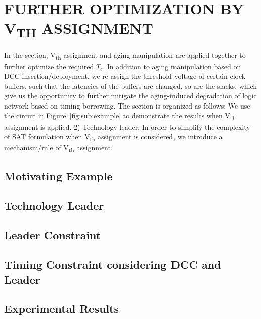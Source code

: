 \section{FURTHER OPTIMIZATION BY V\textsubscript{TH} ASSIGNMENT}
\label{sec:TVA}
In the section, V\textsubscript{th} assignment and aging manipulation are applied together to further optimize the required $T_c$. In addition to aging manipulation based on DCC insertion/deployment, we re-assign the threshold voltage of certain clock buffers, such that the latencies of the buffers are changed, so are the slacks, which give us the opportunity to further mitigate the aging-induced degradation of logic network based on timing borrowing. The section is organized as follows:  We use the circuit in Figure~\ref{fig:sub:example} to demonstrate the results when V\textsubscript{th} assignment is applied. 2) Technology leader: In order to simplify the complexity of SAT formulation when V\textsubscript{th} assignment is considered, we introduce a mechanism/rule of V\textsubscript{th} assignment.

\subsection{Motivating Example}
\label{sec:TVA:example}

\subsection{Technology Leader}
\label{sec:TVA:leader}

\subsection{Leader Constraint}
\label{sec:TVA:leaderconstraint}

\subsection{Timing Constraint considering DCC and Leader}
\label{sec:TVA:timingconstraint}

\subsection{Experimental Results}
\label{sec:TVA:experiment}